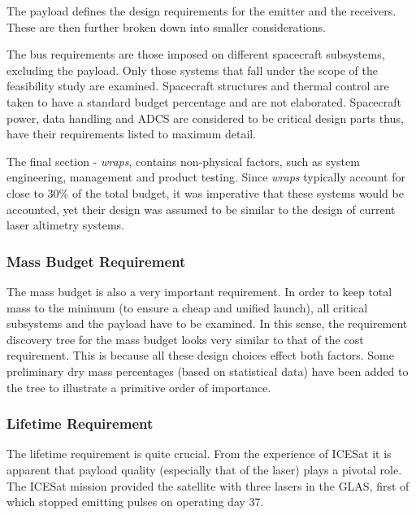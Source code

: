 The payload defines the design requirements for the emitter and the receivers. These are then further broken down into smaller considerations.

The bus requirements are those imposed on different spacecraft subsystems, excluding the payload. Only those systems that fall under the scope of the feasibility study are examined. Spacecraft structures and thermal control are taken to have a standard budget percentage and are not elaborated. Spacecraft power, data handling and \ac{ADCS} are considered to be critical design parts thus, have their requirements listed to maximum detail.

The final section - \emph{wraps}, contains non-physical factors, such as system engineering, management and product testing. Since \emph{wraps} typically account for close to 30\% of the total budget\cite{larson}, it was imperative that these systems would be accounted, yet their design was assumed to be similar to the design of current laser altimetry systems.

\subsubsection{Mass Budget Requirement}
\label{blMBR} 
The mass budget is also a very important requirement. In order to keep total mass to the minimum (to ensure a cheap and unified launch), all critical subsystems and the payload have to be examined. In this sense, the requirement discovery tree for the mass budget looks very similar to that of the cost requirement. This is because all these design choices effect both factors. Some preliminary dry mass percentages (based on statistical data\cite{larson}) have been added to the tree to illustrate a primitive order of importance.

\subsubsection{Lifetime Requirement}
\label{blLBR}
The lifetime requirement is quite crucial. From the experience of ICESat it is apparent that payload quality (especially that of the laser) plays a pivotal role. The ICESat mission provided the satellite with three lasers in the \ac{GLAS}, first of which stopped emitting pulses on operating day 37\cite{glasreview}. 